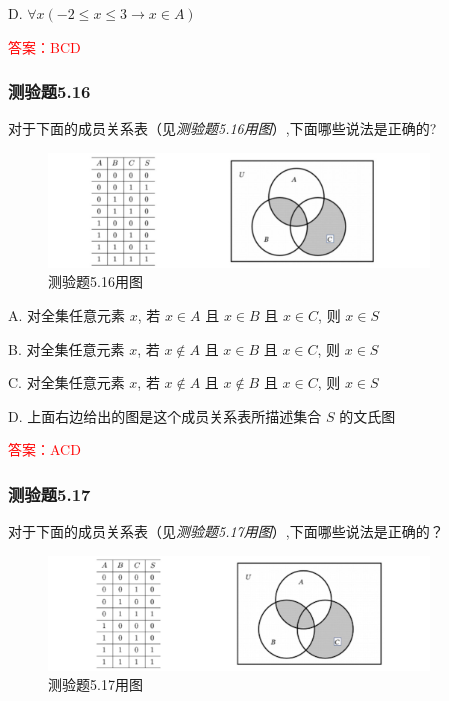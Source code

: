 \documentclass[UTF8, heading=true]{ctexart}
\begin{document}
D. 
$
\forall x(-2 \leq x \leq 3 \rightarrow x \in A)
$

\textcolor{red}{答案：BCD}


\subsubsection{测验题5.16}

对于下面的成员关系表（见\textit{测验题5.16用图}）,下面哪些说法是正确的?

\begin{figure}[htbp]
  \centering
  \includegraphics[width=0.9\textwidth]{5.16.jpg} %
  \caption{测验题5.16用图}
\end{figure}


A. 对全集任意元素 $x$, 若 $x \in A$ 且 $x \in B$ 且 $x \in C$, 则 $x \in S$

B. 对全集任意元素 $x$, 若 $x \notin A$ 且 $x \in B$ 且 $x \in C$, 则 $x \in S$

C. 对全集任意元素 $x$, 若 $x \notin A$ 且 $x \notin B$ 且 $x \in C$, 则 $x \in S$

D. 上面右边给出的图是这个成员关系表所描述集合 $S$ 的文氏图

\textcolor{red}{答案：ACD}

\subsubsection{测验题5.17}
对于下面的成员关系表（见\textit{测验题5.17用图}）,下面哪些说法是正确的？

\begin{figure}[htbp]
  \centering
  \includegraphics[width=0.9\textwidth]{5.17.jpg} %
  \caption{测验题5.17用图}
\end{figure}
\end{document}
